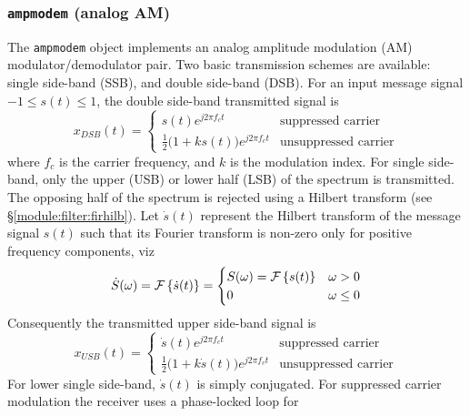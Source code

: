 \subsubsection{{\tt ampmodem} (analog AM)}
\label{module:modem:analog:ampmodem}
The {\tt ampmodem} object implements an analog amplitude modulation (AM)
modulator/demodulator pair.
Two basic transmission schemes are available:
single side-band (SSB), and
double side-band (DSB).
%
For an input message signal $-1 \le s(t) \le 1$, the double side-band
transmitted signal is
%
\begin{equation}
\label{eqn:modem:ampmodem:dsb_tx}
    x_{DSB}(t) = 
    \begin{cases}
        s(t)e^{j 2 \pi f_c t}   &   \text{suppressed carrier} \\
        \frac{1}{2}\bigl(1+ks(t)\bigr)e^{j 2 \pi f_c t}   &   \text{unsuppressed carrier}
    \end{cases}
\end{equation}
%
where $f_c$ is the carrier frequency, and $k$ is the modulation index.
%
For single side-band, only the upper (USB) or lower half (LSB)
of the spectrum is transmitted.
The opposing half of the spectrum is rejected using a Hilbert transform
(see \S\ref{module:filter:firhilb}).
Let $\dot{s}(t)$ represent the Hilbert transform of the message signal
$s(t)$ such that its Fourier transform is non-zero only for positive
frequency components, viz
%
\begin{equation}
\label{eqn:modem:ampmodem:ssb_hilbert}
    \dot{S}(\omega) = \mathcal{F}\left\{ \dot{s}(t) \right\} =
    \begin{cases}
        S(\omega) = \mathcal{F}\left\{ s(t) \right\} & \omega > 0 \\
        0                                   & \omega \leq 0
    \end{cases}
\end{equation}
%
Consequently the transmitted upper side-band signal is
%
\begin{equation}
\label{eqn:modem:ampmodem:ssb_tx}
    x_{USB}(t) = 
    \begin{cases}
        \dot{s}(t)e^{j 2 \pi f_c t}   &   \text{suppressed carrier} \\
        \frac{1}{2}\bigl(1+k\dot{s}(t)\bigr)e^{j 2 \pi f_c t}   &   \text{unsuppressed carrier}
    \end{cases}
\end{equation}
%
For lower single side-band, $\dot{s}(t)$ is simply conjugated.
%
For suppressed carrier modulation the receiver uses a phase-locked loop for

